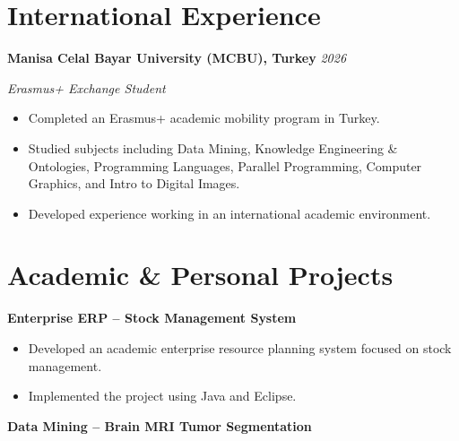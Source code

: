 \documentclass[a4paper,10pt]{article}
\begin{document}

\section*{International Experience}

\noindent
\textbf{Manisa Celal Bayar University (MCBU), Turkey}
\hfill
\textit{2026}


\textit{Erasmus+ Exchange Student}

\begin{itemize}[
    leftmargin=*,
    noitemsep,
    topsep=0pt,
    partopsep=0pt,
    parsep=0pt
]

    \item Completed an Erasmus+ academic mobility program in Turkey.

    \item Studied subjects including Data Mining, Knowledge Engineering \& Ontologies, Programming Languages, Parallel Programming, Computer Graphics, and Intro to Digital Images.

    \item Developed experience working in an international academic environment.

\end{itemize}



\section*{Academic \& Personal Projects}

\noindent
\textbf{Enterprise ERP -- Stock Management System}

\begin{itemize}[
    leftmargin=*,
    noitemsep,
    topsep=0pt,
    partopsep=0pt,
    parsep=0pt
]

    \item Developed an academic enterprise resource planning system focused on stock management.

    \item Implemented the project using Java and Eclipse.

\end{itemize}


\noindent
\textbf{Data Mining -- Brain MRI Tumor Segmentation}
\end{document}
